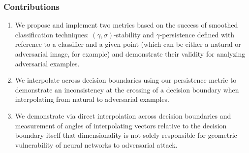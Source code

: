 






\begin{frame}
  \frametitle{Contributions}
 \begin{enumerate}
     \item We propose and implement two metrics based on the success of smoothed classification techniques:  $(\gamma,\sigma)$-stability and $\gamma$-persistence defined with reference to a classifier and a given point (which can be either a natural or adversarial image, for example) and demonstrate their validity for analyzing adversarial examples. 
     \item We interpolate across decision boundaries using our persistence metric to demonstrate an inconsistency at the crossing of a decision boundary when interpolating from natural to adversarial examples.
     \item We demonstrate via direct interpolation across decision boundaries and measurement of angles of interpolating vectors relative to the decision boundary itself that dimensionality is not solely responsible for geometric vulnerability of neural networks to adversarial attack. 
 \end{enumerate}
 \end{frame}

